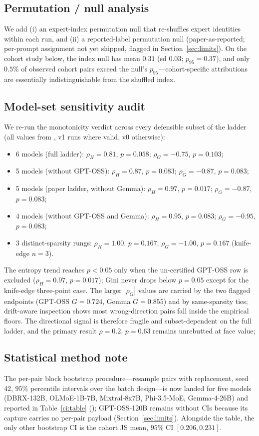 \documentclass[sigconf]{acmart}
\begin{document}
\subsection{Permutation / null analysis}
We add (i) an expert-index permutation null that re-shuffles expert
identities within each run, and (ii) a reported-label permutation null
(paper-as-reported; per-prompt assignment not yet shipped, flagged in
Section~\ref{sec:limits}). On the cohort study below, the index null has
mean $0.31$ (sd $0.03$; $p_{95} = 0.37$), and only $0.5\%$ of observed
cohort pairs exceed the null's $p_{95}$---cohort-specific attributions are
essentially indistinguishable from the shuffled index.

\subsection{Model-set sensitivity audit}
\label{sec:verdict}
We re-run the monotonicity verdict across every defensible subset of the
ladder (all values from , v1 runs
where valid, v0 otherwise):
\begin{itemize}
\item 6 models (full ladder): $\rho_H = 0.81$, $p = 0.058$; $\rho_G = -0.75$, $p = 0.103$;
\item 5 models (without GPT-OSS): $\rho_H = 0.87$, $p = 0.083$; $\rho_G = -0.87$, $p = 0.083$;
\item 5 models (paper ladder, without Gemma): $\rho_H = 0.97$, $p = 0.017$; $\rho_G = -0.87$, $p = 0.083$;
\item 4 models (without GPT-OSS and Gemma): $\rho_H = 0.95$, $p = 0.083$; $\rho_G = -0.95$, $p = 0.083$;
\item 3 distinct-sparsity rungs: $\rho_H = 1.00$, $p = 0.167$; $\rho_G = -1.00$, $p = 0.167$ (knife-edge $n = 3$).
\end{itemize}
The entropy trend reaches $p < 0.05$ only when the un-certified GPT-OSS
row is excluded ($\rho_H = 0.97$, $p = 0.017$); Gini never drops below
$p = 0.05$ except for the knife-edge
three-point case. The larger $|\rho_G|$ values are carried by the two
flagged endpoints (GPT-OSS $G = 0.724$, Gemma $G = 0.855$) and by
same-sparsity ties; drift-aware inspection shows most wrong-direction pairs
fall inside the empirical floors. The directional signal is therefore
fragile and subset-dependent on the full ladder, and the primary result
$\rho = 0.2$, $p = 0.63$ remains unrebutted at face value;

\subsection{Statistical method note}
The per-pair block bootstrap procedure---resample pairs with replacement,
seed 42, $95\%$ percentile intervals over the batch design---is now landed
for five models (DBRX-132B, OLMoE-1B-7B, Mixtral-8x7B, Phi-3.5-MoE,
Gemma-4-26B) and reported in Table~\ref{ci:table}
(); GPT-OSS-120B remains without CIs because
its capture carries no per-pair payload (Section~\ref{sec:limits}).
Alongside the table, the only other bootstrap CI is the cohort JS mean,
$95\%$ CI $[0.206, 0.231]$.
\end{document}
